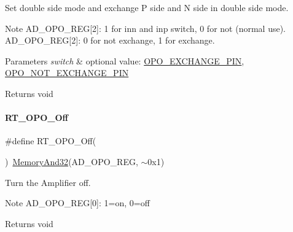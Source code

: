 Set double side mode and exchange P side and N side in double side mode. 

\begin{DoxyNote}{Note}
A\+D\+\_\+\+O\+P\+O\+\_\+\+R\+EG\mbox{[}2\mbox{]}\+: 1 for inn and inp switch, 0 for not (normal use). A\+D\+\_\+\+O\+P\+O\+\_\+\+R\+EG\mbox{[}2\mbox{]}\+: 0 for not exchange, 1 for exchange. 
\end{DoxyNote}

\begin{DoxyParams}{Parameters}
{\em switch} & optional value\+: \mbox{\hyperlink{a00002_af0663f5e9fee7a904ad95d1a4ecdaebda8866b250a87989e76add11875358e4ae}{O\+P\+O\+\_\+\+E\+X\+C\+H\+A\+N\+G\+E\+\_\+\+P\+IN}}, \mbox{\hyperlink{a00002_af0663f5e9fee7a904ad95d1a4ecdaebda4c251187b10da59c8696dbf4951b49d3}{O\+P\+O\+\_\+\+N\+O\+T\+\_\+\+E\+X\+C\+H\+A\+N\+G\+E\+\_\+\+P\+IN}} \\
\hline
\end{DoxyParams}
\begin{DoxyReturn}{Returns}
void 
\end{DoxyReturn}
\mbox{\label{a00002_aaaa6d1267ea1064b765948a2ab8dd934}} 
\paragraph{\texorpdfstring{R\+T\+\_\+\+O\+P\+O\+\_\+\+Off}{RT\_OPO\_Off}}
{\footnotesize\ttfamily \#define R\+T\+\_\+\+O\+P\+O\+\_\+\+Off(\begin{DoxyParamCaption}{ }\end{DoxyParamCaption})~\mbox{\hyperlink{a00020_ad87cedffcaadc51db22594fce55173d4}{Memory\+And32}}(A\+D\+\_\+\+O\+P\+O\+\_\+\+R\+EG, $\sim$0x1)}



Turn the Amplifier off. 

\begin{DoxyNote}{Note}
A\+D\+\_\+\+O\+P\+O\+\_\+\+R\+EG\mbox{[}0\mbox{]}\+: 1=on, 0=off 
\end{DoxyNote}
\begin{DoxyReturn}{Returns}
void 
\end{DoxyReturn}
\mbox{\label{a00002_a6ce23f7d735a1eedc00c509721b79446}} 
